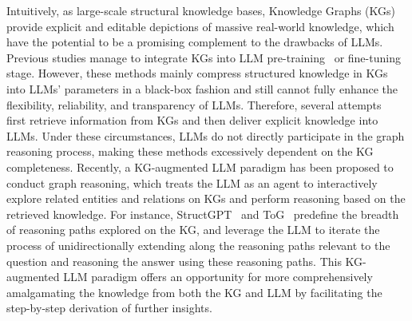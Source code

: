 \documentclass{article}
\begin{document}
Intuitively, as large-scale structural knowledge bases, Knowledge Graphs (KGs)~\cite{bollacker2008freebase, auer2007dbpedia, chen2024tmea, wang2024unleashing} provide explicit and editable depictions of massive real-world knowledge, which have the potential to be a promising complement to the drawbacks of LLMs. 
 Previous studies manage to integrate KGs into LLM pre-training~\cite{zhang2019ernie, wang2021kepler} or fine-tuning~\cite{yao2019kg, luo2024reasoning} stage.
However, these methods mainly compress structured knowledge in KGs into LLMs' parameters in a black-box fashion and still cannot fully enhance the flexibility, reliability, and transparency of LLMs. 
Therefore, several attempts ~\cite{baek2023knowledge, axelsson2023using,wang2023boosting} first retrieve information from KGs and then deliver explicit knowledge into LLMs. Under these circumstances, LLMs do not directly participate in the graph reasoning process, making these methods excessively dependent on the KG completeness.
Recently, a KG-augmented LLM paradigm has been proposed to conduct graph reasoning, which treats the LLM as an agent to interactively explore related entities and relations on KGs and perform reasoning based on the retrieved knowledge.
For instance, StructGPT~\cite{jiang2023structgpt} and ToG~\cite{sun2024think} predefine the breadth of reasoning paths explored on the KG, and leverage the LLM to iterate the process of unidirectionally extending along the reasoning paths relevant to the question and reasoning the answer using these reasoning paths.
This KG-augmented LLM paradigm offers an opportunity for more comprehensively amalgamating the knowledge from both the KG and LLM by facilitating the step-by-step derivation of further insights.
\end{document}
